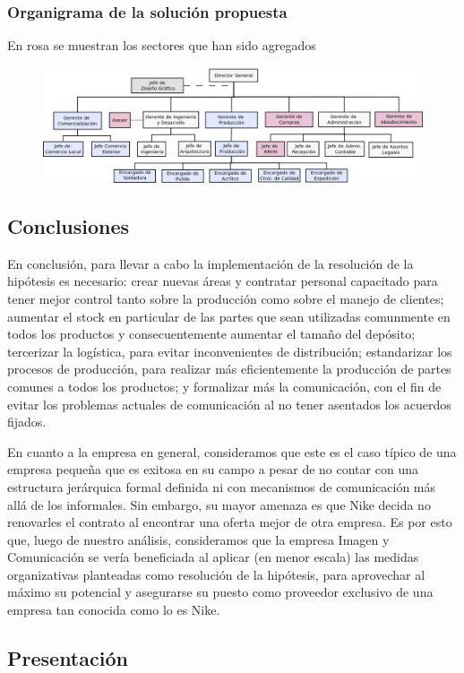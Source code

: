 \documentclass[a4paper,10pt,titlepage]{article}
\begin{document}
\newpage
\subsubsection{Organigrama de la soluci\'on propuesta}
En rosa se muestran los sectores que han sido agregados
\begin{figure}[H]
\centering
\includegraphics[angle=90,scale=0.5]{./Organigramas/OrganiHipotesis.png}
\end{figure}


\newpage
\subsection{Conclusiones}

En conclusión, para llevar a cabo la implementación de la resolución de la hipótesis es necesario:
crear nuevas \'areas y contratar personal capacitado para tener mejor control tanto sobre la producci\'on como sobre el manejo de clientes; 
aumentar el stock en particular de las partes que sean utilizadas comunmente en todos los productos y consecuentemente aumentar el tama\~no del dep\'osito;
tercerizar la log\'istica, para evitar inconvenientes de distribuci\'on; estandarizar los procesos de producci\'on, para realizar m\'as eficientemente la 
producci\'on de partes comunes a todos los productos;  y formalizar m\'as la comunicaci\'on, con el fin de evitar los problemas actuales de comunicaci\'on 
al no tener asentados los acuerdos fijados.

En cuanto a la empresa en general, consideramos que este es el caso t\'ipico de una empresa peque\~na que es exitosa en su campo a pesar de no contar 
con una estructura jer\'arquica formal definida ni con mecanismos de comunicaci\'on m\'as all\'a de los informales. Sin embargo, su mayor amenaza es que 
Nike decida no renovarles el contrato al encontrar una oferta mejor de otra empresa. Es por esto que, luego de nuestro an\'alisis, consideramos que
 la empresa Imagen y Comunicaci\'on se ver\'ia beneficiada al aplicar (en menor escala) las medidas organizativas planteadas como resoluci\'on de la hip\'otesis,
para aprovechar al m\'aximo su potencial y asegurarse su puesto como proveedor exclusivo de una empresa tan conocida como lo es Nike.

\newpage
\vspace*{\fill}
\begin{center}
\begingroup
\titlerule
\vspace{1cm}
\section{Presentaci\'on}
\vspace{1cm}
\titlerule
\endgroup
\end{center}
\vspace*{\fill}

\newpage

\end{document}
